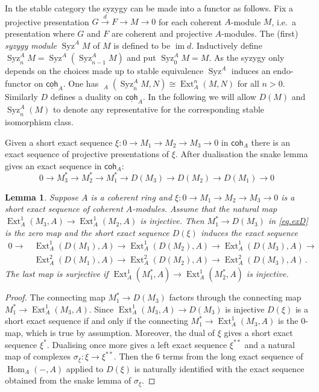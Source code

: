 \documentclass[a4paper,10pt]{amsart}
\theoremstyle{plain}
\newtheorem{lem}[xx]{Lemma}%
\theoremstyle{definition}
\theoremstyle{remark}
\numberwithin{equation}{xx}
\DeclareMathOperator{\Ext}{Ext}
\DeclareMathOperator{\Hom}{Hom}
\DeclareMathOperator{\uHom}{\ul{\Hom}}
\DeclareMathOperator{\im}{im}
\DeclareMathOperator{\Syz}{Syz}
\newcommand{\co}{\colon}
\newcommand{\ra}{\rightarrow}
\newcommand{\lra}{\longrightarrow}
\newcommand{\ucoh}{\underline{\cat{coh}}}
\newcommand{\cat}[1]{\mathsf{{#1}}}
\newcommand{\hm}[4]{{\Hom}_{#2}^{#1}({#3},{#4})}
\newcommand{\uhm}[4]{{\uHom}_{#2}^{#1}({#3},{#4})}
\newcommand{\ul}[1]{\underline{{#1}}}
\newcommand{\xra}[1]{\xrightarrow{{#1}}}
\newcommand{\xt}[4]{{\Ext} _{#2}^{#1}({#3},{#4})}
\newcommand{\syz}[2]{{\Syz}_{#2}^{#1}}
\begin{document}
In the stable category the syzygy can be made into a functor as follows. Fix a projective presentation \(G\xra{d} F\ra M\ra 0\) for each coherent \(A\)-module \(M\), i.e.\ a presentation where \(G\) and \(F\) are coherent and projective \(A\)-modules. The (first) \emph{syzygy module} \(\syz{A}{}M\) of \(M\) is defined to be \(\im d\). Inductively define \(\syz{A}{n}M=\syz{A}{}(\syz{A}{n-1}M)\) and put \(\syz{A}{0}M=M\). 
As the syzygy only depends on the choices made up to stable equivalence \(\syz{A}{}\) induces an endo-functor on \(\ucoh_{A}\). One has \(\uhm{}{A}{\syz{A}{n}M}{N}\cong\xt{n}{A}{M}{N}\) for all \(n>0\). 
Similarly \(D\) defines a duality on \(\ucoh_{A}\).  In the following we will allow \(D(M)\) and \(\syz{A}{n}(M)\) to denote any representative for the corresponding stable isomorphism class. 

Given a short exact sequence \(\xi\co 0\ra M_{1}\ra M_{2}\ra M_{3}\ra 0\) in \(\cat{coh}_{A}\) there is an exact sequence of projective presentations of \(\xi\). After dualisation the snake lemma gives an exact sequence in \(\cat{coh}_{A}\):
\begin{equation}\label{eq.exD}
0\ra M_{3}^{*}\ra M_{2}^{*}\ra M_{1}^{*}\ra D(M_{3})\ra D(M_{2})\ra D(M_{1})\ra 0
\end{equation}
\begin{lem}\label{lem.Dref}
Suppose \(A\) is a coherent ring and \(\xi\co  0\ra M_{1}\ra M_{2}\ra M_{3}\ra 0\) is a short exact sequence of coherent \(A\)-modules\textup{.} Assume that the natural map \(\xt{1}{A}{M_{3}}{A}\ra \xt{1}{A}{M_{2}}{A}\) is injective\textup{.} Then \(M_{1}^{*}\ra D(M_{3})\) in \eqref{eq.exD} is the zero map and the short exact sequence \(D(\xi)\) induces the exact sequence
\begin{align*}\label{eq.Dseq}
0\lra & \,\xt{1}{A}{D(M_{1})}{A}\lra\xt{1}{A}{D(M_{2})}{A}\lra\xt{1}{A}{D(M_{3})}{A}\lra \\
& \,\xt{2}{A}{D(M_{1})}{A}\lra\xt{2}{A}{D(M_{2})}{A}\lra\xt{2}{A}{D(M_{3})}{A}\,.
\end{align*}
The last map is surjective if \(\xt{1}{A}{M_{1}^{*}}{A}\ra\xt{1}{A}{M_{2}^{*}}{A}\) is injective\textup{.}
\end{lem}
\begin{proof}
The connecting map \(M_{1}^{*}\ra D(M_{3})\) factors through the connecting map \(M_{1}^{*}\ra\xt{1}{A}{M_{3}}{A}\). Since \(\xt{1}{A}{M_{3}}{A}\ra D(M_{3})\) is injective \(D(\xi)\) is a short exact sequence if and only if the connecting \(M_{1}^{*}\ra\xt{1}{A}{M_{3}}{A}\) is the \(0\)-map, which is true by assumption. Moreover, the dual of \(\xi\) gives a short exact sequence \(\xi^{*}\). Dualising once more gives a left exact sequence \(\xi^{**}\) and a natural map of complexes \(\sigma_{\xi}\co \xi\ra\xi^{**}\). Then the \(6\) terms from the long exact sequence of \(\hm{}{A}{-}{A}\) applied to \(D(\xi)\) is naturally identified with the exact sequence obtained from the snake lemma of \(\sigma_{\xi}\).
\end{proof}
\end{document}
